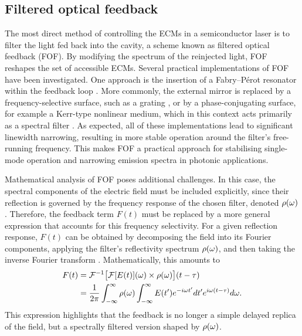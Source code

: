 \subsection*{Filtered optical feedback}
\label{subsec:FOF}
%
The most direct method of controlling the ECMs in a semiconductor laser is to filter the light fed back into the cavity, a scheme known as filtered optical feedback (FOF). 
By modifying the spectrum of the reinjected light, FOF reshapes the set of accessible ECMs.
Several practical implementations of FOF have been investigated. One approach is the insertion of a Fabry–Pérot resonator within the feedback loop \cite{detienne1997semiconductor}. More commonly, the external mirror is replaced by a frequency-selective surface, such as a grating \cite{dahmani1987frequency, harvey1991external, jin1996single}, or by a phase-conjugating surface, for example a Kerr-type nonlinear medium, which in this context acts primarily as a spectral filter \cite{agrawal1984line}.
As expected, all of these implementations lead to significant linewidth narrowing, resulting in more stable operation around the filter’s free-running frequency.
This makes FOF a practical approach for stabilising single-mode operation and narrowing emission spectra in photonic applications.
%
\par
%
Mathematical analysis of FOF poses additional challenges. 
In this case, the spectral components of the electric field must be included explicitly, since their reflection is governed by the frequency response of the chosen filter, denoted $\rho(\omega)$.
Therefore, the feedback term $F(t)$ must be replaced by a more general expression that accounts for this frequency selectivity.
For a given reflection response, $F(t)$ can be obtained by decomposing the field into its Fourier components, applying the filter’s reflectivity spectrum $\rho(\omega)$, and then taking the inverse Fourier transform \cite{yousefi1999dynamical}.
Mathematically, this amounts to
%
\begin{equation}
    \begin{aligned}
    \label{eq:FOF}
         F(t) &=  \mathcal{F}^{-1}\big[ \mathcal{F}[E(t)](\omega) \times \rho(\omega) \big](t-\tau)\\
              &= \frac{1}{2\pi} \int_{-\infty}^{\infty} \rho(\omega) \int_{-\infty}^{\infty} E(t') e^{-i \omega t'} dt' e^{i \omega (t-\tau)} d\omega.
    \end{aligned}
\end{equation}
%
This expression highlights that the feedback is no longer a simple delayed replica of the field, but a spectrally filtered version shaped by $\rho(\omega)$.

